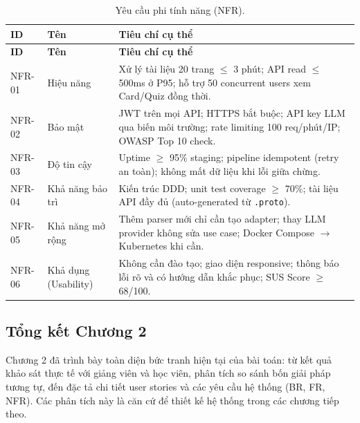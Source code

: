 \begin{longtable}{|p{1.5cm}|p{4cm}|p{9cm}|}
    \caption{Yêu cầu phi tính năng (NFR).} \label{tab:nfr} \\
    \hline
    \textbf{ID} & \textbf{Tên} & \textbf{Tiêu chí cụ thể} \\
    \hline
    \endfirsthead \hline
    \textbf{ID} & \textbf{Tên} & \textbf{Tiêu chí cụ thể} \\
    \hline \endhead

    NFR-01 & Hiệu năng &
        Xử lý tài liệu 20 trang $\leq$ 3 phút; API read $\leq$ 500ms ở P95;
        hỗ trợ 50 concurrent users xem Card/Quiz đồng thời. \\ \hline

    NFR-02 & Bảo mật &
        JWT trên mọi API; HTTPS bắt buộc; API key LLM qua biến môi trường;
        rate limiting 100 req/phút/IP; OWASP Top 10 check. \\ \hline

    NFR-03 & Độ tin cậy &
        Uptime $\geq$ 95\% staging; pipeline idempotent (retry an toàn);
        không mất dữ liệu khi lỗi giữa chừng. \\ \hline

    NFR-04 & Khả năng bảo trì &
        Kiến trúc DDD; unit test coverage $\geq$ 70\%; tài liệu API đầy đủ
        (auto-generated từ \texttt{.proto}). \\ \hline

    NFR-05 & Khả năng mở rộng &
        Thêm parser mới chỉ cần tạo adapter; thay LLM provider không sửa
        use case; Docker Compose $\to$ Kubernetes khi cần. \\ \hline

    NFR-06 & Khả dụng (Usability) &
        Không cần đào tạo; giao diện responsive; thông báo lỗi rõ và có
        hướng dẫn khắc phục; SUS Score $\geq$ 68/100. \\ \hline
\end{longtable}

\subsection{Tổng kết Chương 2}

Chương 2 đã trình bày toàn diện bức tranh hiện tại của bài toán: từ kết quả
khảo sát thực tế với giảng viên và học viên, phân tích so sánh bốn giải pháp
tương tự, đến đặc tả chi tiết user stories và các yêu cầu hệ thống (BR, FR,
NFR). Các phân tích này là căn cứ để thiết kế hệ thống trong các chương
tiếp theo.
